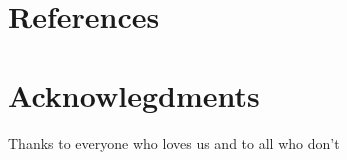 \documentclass[12pt,review,authoryear]{elsarticle}
\begin{document}

\section*{References}

	 
	



\section*{Acknowlegdments}
	Thanks to everyone who loves us and to all who don't



\end{document}
